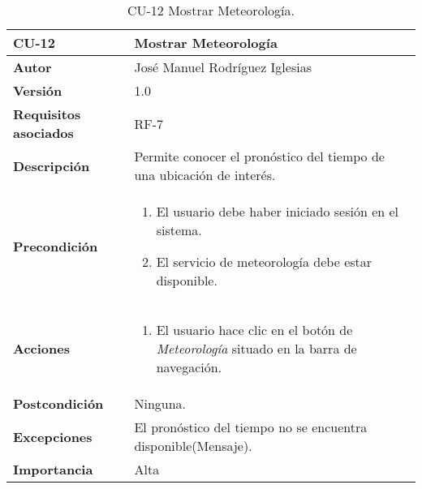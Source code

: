 \begin{table}[h]
	\centering
	\begin{tabularx}{\linewidth}{ p{} p{} }
		\toprule
		\textbf{CU-12}    & \textbf{Mostrar Meteorología}\\
		\toprule
            \textbf{Autor}                & José Manuel Rodríguez Iglesias \\
		\textbf{Versión}              & 1.0    \\
	\textbf{Requisitos asociados} & RF-7\\
		\textbf{Descripción}          & Permite conocer el pronóstico del tiempo de una ubicación de interés. \\
		\textbf{Precondición}         &  
            \begin{enumerate}
			\def\labelenumi{\arabic{enumi}.}
			\tightlist
			\item El usuario debe haber iniciado sesión en el sistema.
			\item El servicio de meteorología debe estar disponible.
		\end{enumerate}\\
    
  
		\textbf{Acciones}             &
		\begin{enumerate}
			\def\labelenumi{\arabic{enumi}.}
			\tightlist
			\item El usuario hace clic en el botón de\textit{ Meteorología} situado en la barra de navegación.
		\end{enumerate}\\
		\textbf{Postcondición}        & Ninguna. \\
		\textbf{Excepciones}          & El pronóstico del tiempo no se encuentra disponible(Mensaje).\\
		\textbf{Importancia}          & Alta\\
		\bottomrule
	\end{tabularx}
	\caption{CU-12 Mostrar Meteorología.}
\end{table}

